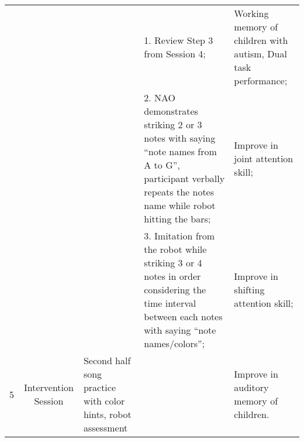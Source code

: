 \begin{sidewaystable}[tbp]
\begin{center}
{\begin{tabular}{cccll}
	{\color[HTML]{666666} }                    & {\color[HTML]{666666} }                                          & \multicolumn{1}{l}{{\color[HTML]{666666} }}                                                                                                           & {\color[HTML]{666666} 1. Review Step 3 from Session 4;}                                                                                                                              & {\color[HTML]{666666} Working memory of children with autism, Dual   task performance;}                                                                                \\
	{\color[HTML]{666666} }                    & {\color[HTML]{666666} }                                          & \multicolumn{1}{l}{{\color[HTML]{666666} }}                                                                                                           & {\color[HTML]{666666} 2. NAO demonstrates striking   2 or 3 notes with saying “note names from A to G”, participant verbally   repeats the notes name while robot hitting the bars;} & {\color[HTML]{666666} Improve in joint attention skill;}                                                                                                               \\
	{\color[HTML]{666666} }                    & {\color[HTML]{666666} }                                          & \multicolumn{1}{l}{{\color[HTML]{666666} }}                                                                                                           & {\color[HTML]{666666} 3. Imitation from the robot   while striking 3 or 4 notes in order considering the time interval between   each notes with saying “note names/colors”;}        & {\color[HTML]{666666} Improve in shifting attention skill;}                                                                                                            \\
	\multirow{-4}{*}{{\color[HTML]{666666} 5}} & \multirow{-17}{*}{{\color[HTML]{666666} Intervention   Session}} & \multicolumn{1}{l}{\multirow{-4}{*}{{\color[HTML]{666666} Second half song practice with color hints, robot assessment}}}                             &                                                                                                                                                                                      & {\color[HTML]{666666} Improve in auditory memory of children.}                                                                                                         \\

\end{tabular}}
\end{center}
\end{sidewaystable}
